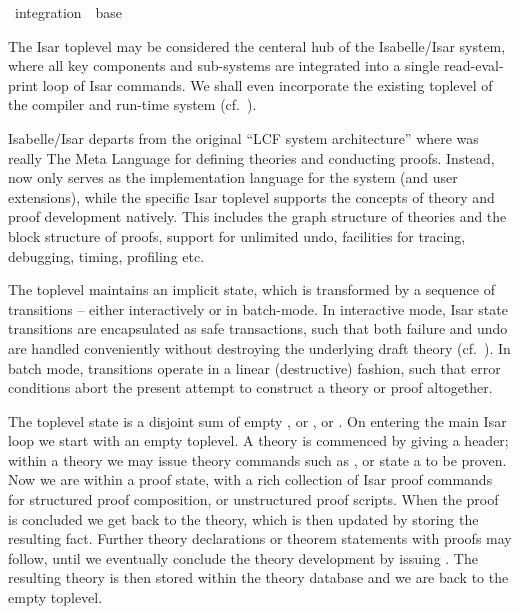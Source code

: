 %
\begin{isabellebody}%
\def\isabellecontext{integration}%
%
\isadelimtheory
\isanewline
\isanewline
\isanewline
%
\endisadelimtheory
%
\isatagtheory
{}\isamarkupfalse%
\ integration\ \ base\ %
\endisatagtheory
{\isafoldtheory}%
%
\isadelimtheory
%
\endisadelimtheory
%
\isamarkuptrue%
%
\isamarkuptrue%
%
\begin{isamarkuptext}%
The Isar toplevel may be considered the centeral hub of the
  Isabelle/Isar system, where all key components and sub-systems are
  integrated into a single read-eval-print loop of Isar commands.  We
  shall even incorporate the existing {\ML} toplevel of the compiler
  and run-time system (cf.\ ).

  Isabelle/Isar departs from the original ``LCF system architecture''
  where {\ML} was really The Meta Language for defining theories and
  conducting proofs.  Instead, {\ML} now only serves as the
  implementation language for the system (and user extensions), while
  the specific Isar toplevel supports the concepts of theory and proof
  development natively.  This includes the graph structure of theories
  and the block structure of proofs, support for unlimited undo,
  facilities for tracing, debugging, timing, profiling etc.

  \medskip The toplevel maintains an implicit state, which is
  transformed by a sequence of transitions -- either interactively or
  in batch-mode.  In interactive mode, Isar state transitions are
  encapsulated as safe transactions, such that both failure and undo
  are handled conveniently without destroying the underlying draft
  theory (cf.~).  In batch mode,
  transitions operate in a linear (destructive) fashion, such that
  error conditions abort the present attempt to construct a theory or
  proof altogether.

  The toplevel state is a disjoint sum of empty , or
  , or .  On entering the main Isar loop we
  start with an empty toplevel.  A theory is commenced by giving a
  \isa{{\isasymTHEORY}} header; within a theory we may issue theory
  commands such as \isa{{\isasymDEFINITION}}, or state a \isa{{\isasymTHEOREM}} to be proven.  Now we are within a proof state, with a
  rich collection of Isar proof commands for structured proof
  composition, or unstructured proof scripts.  When the proof is
  concluded we get back to the theory, which is then updated by
  storing the resulting fact.  Further theory declarations or theorem
  statements with proofs may follow, until we eventually conclude the
  theory development by issuing \isa{{\isasymEND}}.  The resulting theory
  is then stored within the theory database and we are back to the
  empty toplevel.


\end{isamarkuptext}
\end{isabellebody}
